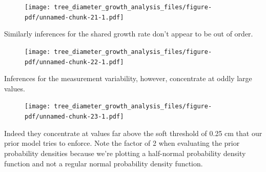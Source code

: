 \documentclass[
  letterpaper,
  DIV=11,
  numbers=noendperiod]{scrartcl}
\newenvironment{Shaded}{\begin{snugshade}}{\end{snugshade}}
\newcommand{\AttributeTok}[1]{\textcolor[rgb]{0.40,0.45,0.13}{#1}}
\newcommand{\DecValTok}[1]{\textcolor[rgb]{0.68,0.00,0.00}{#1}}
\newcommand{\FunctionTok}[1]{\textcolor[rgb]{0.28,0.35,0.67}{#1}}
\newcommand{\NormalTok}[1]{\textcolor[rgb]{0.00,0.23,0.31}{#1}}
\newcommand{\SpecialCharTok}[1]{\textcolor[rgb]{0.37,0.37,0.37}{#1}}
\newcommand{\StringTok}[1]{\textcolor[rgb]{0.13,0.47,0.30}{#1}}
\begin{document}
\begin{figure}[H]

{\centering \texttt{[image: tree\_diameter\_growth\_analysis\_files/figure-pdf/unnamed-chunk-21-1.pdf]}

}

\end{figure}

Similarly inferences for the shared growth rate don't appear to be out
of order.

\begin{Shaded}
\end{Shaded}

\begin{figure}[H]

{\centering \texttt{[image: tree\_diameter\_growth\_analysis\_files/figure-pdf/unnamed-chunk-22-1.pdf]}

}

\end{figure}

Inferences for the measurement variability, however, concentrate at
oddly large values.

\begin{Shaded}
\end{Shaded}

\begin{figure}[H]

{\centering \texttt{[image: tree\_diameter\_growth\_analysis\_files/figure-pdf/unnamed-chunk-23-1.pdf]}

}

\end{figure}

Indeed they concentrate at values far above the soft threshold of 0.25
cm that our prior model tries to enforce. Note the factor of 2 when
evaluating the prior probability densities because we're plotting a
half-normal probability density function and not a regular normal
probability density function.
\end{document}
